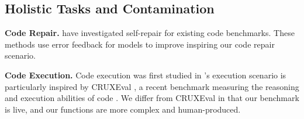 
\subsection{Holistic Tasks and Contamination}



\noindent \textbf{Code Repair.} 
\citep{chen2023teaching, olausson2023demystifying, madaan2023self, peng2023check, zhang2023self} have investigated self-repair for existing code \llm{} benchmarks. These methods use error feedback for models to improve inspiring our code repair scenario.


\noindent \textbf{Code Execution.} 
Code execution was first studied in \citep{austin2021program, nye2021show}
\livecodebench{}'s execution scenario is particularly inspired by CRUXEval \citep{gu2024cruxeval}, a recent benchmark measuring the reasoning and execution abilities of code \llms{}. 
We differ from CRUXEval in that our benchmark is live, and our functions are more complex and human-produced.%


